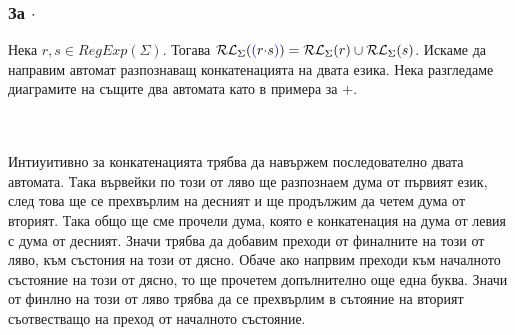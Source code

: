 \documentclass[12pt]{article}
\begin{document}
\subsubsection{За \(\cdot\)}
Нека \(r, s \in RegExp(\Sigma)\). Тогава \(\mathcal{RL}_\Sigma(\textcolor{blue}{(}r \textcolor{blue}{\cdot} s \textcolor{blue}{)}) = \mathcal{RL}_\Sigma(r) \cup \mathcal{RL}_\Sigma(s)\).
Искаме да направим автомат разпознаващ конкатенацията на двата езика.
Нека разгледаме диаграмите на същите два автомата като в примера за \(+\).
\begin{minipage}{.5\textwidth}
\centering
{}
\end{minipage}
\begin{minipage}{.5\textwidth}
\centering
{}
\end{minipage}
\\
\vspace*{5mm}
\\
Интиуитивно за конкатенацията трябва да навържем последователно двата автомата.
Така вървейки по този от ляво ще разпознаем дума от първият език, след това ще се прехвърлим на десният и ще продължим да четем дума от вторият.
Така общо ще сме прочели дума, която е конкатенация на дума от левия с дума от десният.
Значи трябва да добавим преходи от финалните на този от ляво, към състония на този от дясно.
Обаче ако напрвим преходи към началното състояние на този от дясно, то ще прочетем допълнително още една буква.
Значи от финлно на този от ляво трябва да се прехвърлим в сътояние на вторият съотвестващо на преход от началното състояние.
\end{document}
